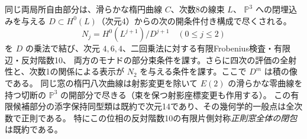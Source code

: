 \begin{theorem}\label{thm:finite-elliptic-octic-windows}
同じ両局所自由部分は、滑らかな楕円曲線 $C$、次数8の線束 $L$、
$\mathbb P^3$ への閉埋込みを与える $D\subset H^0(L)$（次元4）からの次の開条件付き構成で尽くされる。
\[
 N_j= H^0(L^{j+1})/D^{j+1}\quad (0\le j\le2)
\]
を $D$ の乗法で結び、次元 $4,6,4$、二回乗法に対する有限Frobenius検査・有限辺・反対階数10、
両方のモナドの部分束条件を課す。さらに四次の評価の全射性と、次数1の関係による表示が $N_2$ を与える条件を課す。ここで $D^m$ は積の像である。
同じ窓の楕円八次曲線は射影変更を除いて $E(2)$ の滑らかな零曲線を持つ切断の
$\mathbb P^3$ の開部分で尽きる（束を保つ射影座標変更も作用する）。
この有限候補部分の添字保持同型類は既約で次元14であり、その幾何学的一般点は全次数で正則である。
特にこの位相の反対階数10の有限片側対称\emph{正則窓全体の閉包}は既約である。
\end{theorem}
